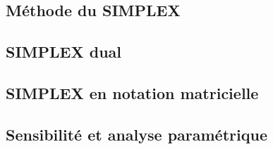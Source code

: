 \subsection{Méthode du SIMPLEX}
\subsection{SIMPLEX dual}
\subsection{SIMPLEX en notation matricielle}
\subsection{Sensibilité et analyse paramétrique}